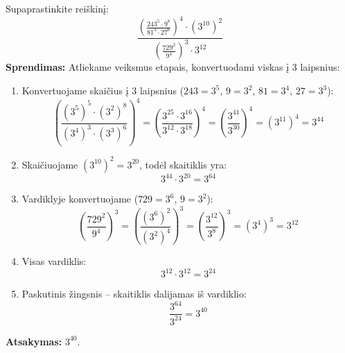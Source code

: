 \documentclass[11pt,a4paper]{scrartcl}
\begin{document}
\begin{example}
Supaprastinkite reiškinį:
$$ \frac{\left(\frac{243^5 \cdot 9^8}{81^3 \cdot 27^6}\right)^4 \cdot\left(3^{10}\right)^2}{\left(\frac{729^2}{9^4}\right)^3 \cdot 3^{12}} $$
\textbf{Sprendimas:} Atliekame veiksmus etapais, konvertuodami viskas į 3 laipsnius:

\begin{enumerate}
    \item Konvertuojame skaičius į 3 laipsnius ($243 = 3^5$, $9 = 3^2$, $81 = 3^4$, $27 = 3^3$):
    $$ \left(\frac{(3^5)^5 \cdot (3^2)^8}{(3^4)^3 \cdot (3^3)^6}\right)^4 = \left(\frac{3^{25} \cdot 3^{16}}{3^{12} \cdot 3^{18}}\right)^4 = \left(\frac{3^{41}}{3^{30}}\right)^4 = (3^{11})^4 = 3^{44} $$
    
    \item Skaičiuojame $(3^{10})^2 = 3^{20}$, todėl skaitiklis yra:
    $$ 3^{44} \cdot 3^{20} = 3^{64} $$
    
    \item Vardiklyje konvertuojame ($729 = 3^6$, $9 = 3^2$):
    $$ \left(\frac{729^2}{9^4}\right)^3 = \left(\frac{(3^6)^2}{(3^2)^4}\right)^3 = \left(\frac{3^{12}}{3^{8}}\right)^3 = (3^4)^3 = 3^{12} $$
    
    \item Visas vardiklis:
    $$ 3^{12} \cdot 3^{12} = 3^{24} $$
    
    \item Paskutinis žingsnis -- skaitiklis dalijamas iš vardiklio:
    $$ \frac{3^{64}}{3^{24}} = 3^{40} $$
\end{enumerate}

\textbf{Atsakymas:} $3^{40}$.
\end{example}
\end{document}
